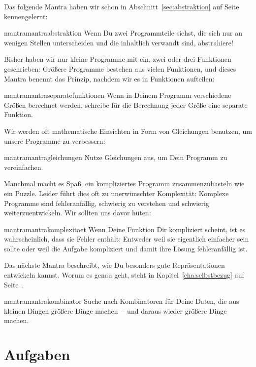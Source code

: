 Das folgende Mantra haben wir schon in Abschnitt~\ref{sec:abstraktion}
auf Seite~\pageref{sec:abstraktion} kennengelernt:
%
\begin{restatable}{mantra}{mantraabstraktion}
  \label{mantra:abstraktion}
  Wenn Du zwei Programmteile siehst, die sich nur an wenigen Stellen
  unterscheiden und die inhaltlich verwandt sind, abstrahiere!
\end{restatable}
%
\noindent Bisher haben wir nur kleine Programme mit ein, zwei oder drei
Funktionen geschrieben: Größere Programme bestehen aus vielen
Funktionen, und dieses Mantra benennt das Prinzip, nachdem wir es in
Funktionen aufteilen:
%
\begin{restatable}{mantra}{mantraseparatefunktionen}
  \label{mantra:separate-funktionen}
  Wenn in Deinem Programm verschiedene Größen berechnet werden,
  schreibe für die Berechnung jeder Größe eine separate Funktion.
\end{restatable}
%
\noindent Wir werden oft mathematische Einsichten in Form von Gleichungen
benutzen, um unsere Programme zu verbessern:
%
\begin{restatable}{mantra}{mantragleichungen}
  \label{mantra:gleichungen}
  Nutze Gleichungen aus, um Dein Programm zu vereinfachen.
\end{restatable}
%
\noindent Manchmal macht es Spaß, ein kompliziertes Programm zusammenzubasteln
wie ein Puzzle.  Leider führt dies oft zu unerwünschter Komplexität:
Komplexe Programme sind fehleranfällig, schwierig zu verstehen und
schwierig weiterzuentwickeln.  Wir sollten uns davor hüten:
%
\begin{restatable}{mantra}{mantrakomplexitaet}
  \label{mantra:komplexitaet}
  Wenn Deine Funktion Dir kompliziert scheint, ist es wahrscheinlich,
  dass sie Fehler enthält: Entweder weil sie eigentlich einfacher
  sein sollte oder weil die Aufgabe kompliziert und damit ihre Lösung
  fehleranfällig ist.
\end{restatable}
%
Das nächste Mantra beschreibt, wie Du besonders gute Repräsentationen
entwickeln kannst.  Worum es genau geht, steht in
Kapitel~\ref{cha:selbstbezug} auf Seite~\pageref{cha:selbstbezug}.
%
\begin{restatable}{mantra}{mantrakombinator}
  \label{mantra:kombinator}
  Suche nach Kombinatoren für Deine Daten, die aus
  kleinen Dingen größere Dinge machen~-- und daraus wieder größere
  Dinge machen.
\end{restatable}

\section*{Aufgaben}

